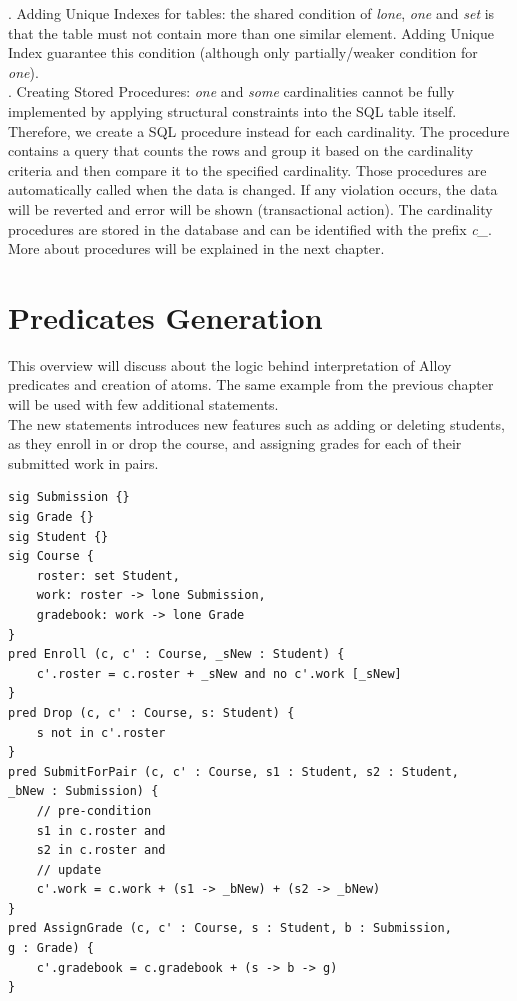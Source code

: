 \documentclass[oneside]{book}
\begin{document}
. Adding Unique Indexes for tables: the shared condition of \textit{lone}, \textit{one} and \textit{set} is that the table must not contain more than one similar element. Adding Unique Index guarantee this condition (although only partially/weaker condition for \textit{one}). \\

. Creating Stored Procedures: \textit{one} and \textit{some} cardinalities cannot be fully implemented by applying structural constraints into the SQL table itself. Therefore, we create a SQL procedure instead for each cardinality. The procedure contains a query that counts the rows and group it based on the cardinality criteria and then compare it to the specified cardinality. Those procedures are automatically called when the data is changed. If any violation occurs, the data will be reverted and error will be shown (transactional action). The cardinality procedures are stored in the database and can be identified with the prefix \textit{c\_}. More about procedures will be explained in the next chapter.

\newpage
\section{Predicates Generation}
\label{sec:predicatesgen}
This overview will discuss about the logic behind interpretation of Alloy predicates and creation of atoms. The same example from the previous chapter will be used with few additional statements.\\

\noindent The new statements introduces new features such as adding or deleting students, as they enroll in or drop the course, and assigning grades for each of their submitted work in pairs.\\

\begin{lstlisting}
sig Submission {}
sig Grade {}
sig Student {}
sig Course {
	roster: set Student,
	work: roster -> lone Submission,
	gradebook: work -> lone Grade
}
pred Enroll (c, c' : Course, _sNew : Student) {
	c'.roster = c.roster + _sNew and no c'.work [_sNew]
}
pred Drop (c, c' : Course, s: Student) {
	s not in c'.roster 
}
pred SubmitForPair (c, c' : Course, s1 : Student, s2 : Student, 
_bNew : Submission) {
	// pre-condition
	s1 in c.roster and
	s2 in c.roster and
	// update
	c'.work = c.work + (s1 -> _bNew) + (s2 -> _bNew)
}
pred AssignGrade (c, c' : Course, s : Student, b : Submission, 
g : Grade) {
	c'.gradebook = c.gradebook + (s -> b -> g)
}
\end{lstlisting}
\end{document}
